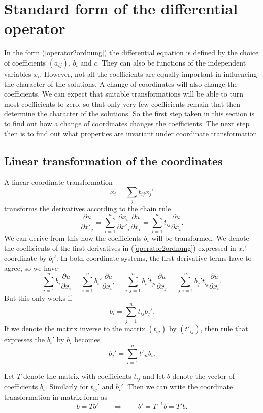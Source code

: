 %
%
%
\section{Standard form of the differential operator}
In the form (\ref{operator2ordnung})
the differential equation is defined by the choice of coefficients
$(a_{ij})$, $b_i$ and $c$.
They can also be functions of the independent variables $x_i$.
However, not all the coefficients are equally important in influencing
the character of the solutions.
A change of coordinates will also change the coefficients.
We can expect that suitable transformations will be able to turn
most coefficients to zero, so that only very few coefficients remain
that then determine the character of the solutions.
So the first step taken in this section is to find out how a change
of coordinates changes the coefficients.
The next step then is to find out what properties are invariant
under coordinate transformation.

\subsection{Linear transformation of the coordinates
\label{lineare-transformation}}
A linear coordinate transformation
%
\[
x_i=\sum_{j}t_{ij}x_j'
\]
transforms the derivatives according to the chain rule
\[
\frac{\partial u}{\partial x'_j}
=
\sum_{i=1}^n
\frac{\partial x_i}{\partial x'_j} \frac{\partial u}{\partial x_i}
=
\sum_{i=1}^nt_{ij}\frac{\partial u}{\partial x_i}.
\]
We can derive from this how the coefficients $b_i$ will be transformed.
We denote the coefficients of the first derivatives in
(\ref{operator2ordnung}) expressed in $x_i'$-coordinate by $b_i'$.
In both coordinate systems, the first derivative terms have to agree, so
we have
\[
\sum_{i=1}^n b_i\frac{\partial u}{\partial x_i}
=
\sum_{i=1}^n b_i'\frac{\partial u}{\partial x_i'}
=
\sum_{i,j=1}^n b_i't_{ji}\frac{\partial u}{\partial x_j}
=
\sum_{j,i=1}^n b_j't_{ij}\frac{\partial u}{\partial x_i}.
\]
But this only works if
\[
b_i = \sum_{j=1}^n t_{ij}b_j'.
\]
If we denote the matrix inverse to the matrix $(t_{ij})$ by $(t'_{ij})$,
then rule that expresses the $b_i'$ by $b_i$ becomes
\[
b_j'=\sum_{i=1}^n t'_{ji}b_i.
\]

Let $T$ denote the matrix with coefficients $t_{ij}$ and let $b$
denote the vector of coefficients $b_i$.
Similarly for $t_{ij}'$ and $b_i'$.
Then we can write the coordinate transformation in matrix form as
\[
b=Tb'
\qquad\Rightarrow\qquad
b'=T^{-1}b=T'b.
\]

